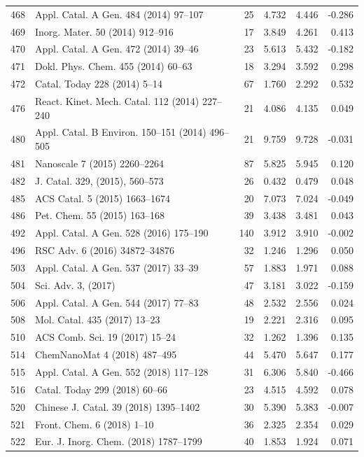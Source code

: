 \begin{longtable}{r p{.39\linewidth} rrrr}
468 & Appl. Catal. A Gen. 484 (2014) 97--107 & 25 & 4.732 & 4.446 & -0.286 \\
469 & Inorg. Mater. 50 (2014) 912--916 & 17 & 3.849 & 4.261 & 0.413 \\
470 & Appl. Catal. A Gen. 472 (2014) 39--46 & 23 & 5.613 & 5.432 & -0.182 \\
471 & Dokl. Phys. Chem. 455 (2014) 60--63 & 18 & 3.294 & 3.592 & 0.298 \\
472 & Catal. Today 228 (2014) 5--14 & 67 & 1.760 & 2.292 & 0.532 \\
476 & React. Kinet. Mech. Catal. 112 (2014) 227--240 & 21 & 4.086 & 4.135 & 0.049 \\
480 & Appl. Catal. B Environ. 150--151 (2014) 496--505 & 21 & 9.759 & 9.728 & -0.031 \\
481 & Nanoscale 7 (2015) 2260--2264 & 87 & 5.825 & 5.945 & 0.120 \\
482 & J. Catal. 329, (2015), 560--573 & 26 & 0.432 & 0.479 & 0.048 \\
485 & ACS Catal. 5 (2015) 1663--1674 & 20 & 7.073 & 7.024 & -0.049 \\
486 & Pet. Chem. 55 (2015) 163--168  & 39 & 3.438 & 3.481 & 0.043 \\
492 & Appl. Catal. A Gen. 528 (2016) 175--190 & 140 & 3.912 & 3.910 & -0.002 \\
496 & RSC Adv. 6 (2016) 34872--34876 & 32 & 1.246 & 1.296 & 0.050 \\
503 & Appl. Catal. A Gen. 537 (2017) 33--39  & 57 & 1.883 & 1.971 & 0.088 \\
504 & Sci. Adv. 3, (2017) & 47 & 3.181 & 3.022 & -0.159 \\
506 & Appl. Catal. A Gen. 544 (2017) 77--83 & 48 & 2.532 & 2.556 & 0.024 \\
508 & Mol. Catal. 435 (2017) 13--23 & 19 & 2.221 & 2.316 & 0.095 \\
510 & ACS Comb. Sci. 19 (2017) 15--24  & 32 & 1.262 & 1.396 & 0.135 \\
514 & ChemNanoMat 4 (2018) 487--495 & 44 & 5.470 & 5.647 & 0.177 \\
515 & Appl. Catal. A Gen. 552 (2018) 117--128 & 31 & 6.306 & 5.840 & -0.466 \\
516 & Catal. Today 299 (2018) 60--66  & 23 & 4.515 & 4.592 & 0.078 \\
520 & Chinese J. Catal. 39 (2018) 1395--1402 & 30 & 5.390 & 5.383 & -0.007 \\
521 & Front. Chem. 6 (2018) 1--10 & 36 & 2.325 & 2.354 & 0.029 \\
522 & Eur. J. Inorg. Chem. (2018) 1787--1799 & 40 & 1.853 & 1.924 & 0.071 \\

\end{longtable}
